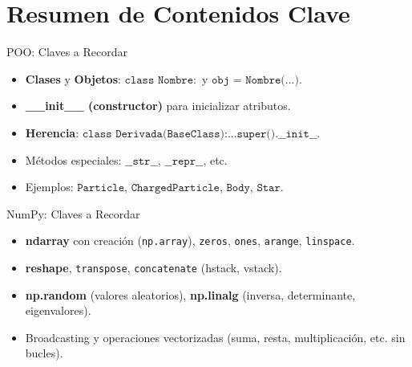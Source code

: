 \documentclass[10pt]{beamer}
\begin{document}
\section{Resumen de Contenidos Clave}

\begin{frame}{POO: Claves a Recordar}
  \begin{itemize}
    \item \textbf{Clases} y \textbf{Objetos}: \(\texttt{class Nombre}:\) y \(\texttt{obj = Nombre(...)}\).
    \item \textbf{\_\_init\_\_ (constructor)} para inicializar atributos.
    \item \textbf{Herencia}: \(\texttt{class Derivada(BaseClass):} ... \texttt{super().\_\_init\_\_}\).
    \item Métodos especiales: \(\texttt{\_\_str\_\_}\), \(\texttt{\_\_repr\_\_}\), etc.
    \item Ejemplos: \(\texttt{Particle}\), \(\texttt{ChargedParticle}\), \(\texttt{Body}\), \(\texttt{Star}\).
  \end{itemize}
\end{frame}

\begin{frame}{NumPy: Claves a Recordar}
  \begin{itemize}
    \item \textbf{ndarray} con creación (\texttt{np.array}), \texttt{zeros}, \texttt{ones}, \texttt{arange}, \texttt{linspace}.
    \item \textbf{reshape}, \texttt{transpose}, \texttt{concatenate} (hstack, vstack).
    \item \textbf{np.random} (valores aleatorios), \textbf{np.linalg} (inversa, determinante, eigenvalores).
    \item Broadcasting y operaciones vectorizadas (suma, resta, multiplicación, etc. sin bucles).
  \end{itemize}
\end{frame}
\end{document}
